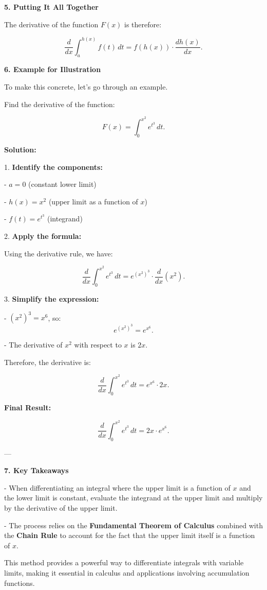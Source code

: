 \documentclass[a4paper,12pt]{book}
\begin{document}
\textbf{5. Putting It All Together}

The derivative of the function \( F(x) \) is therefore:

\[
\dfrac{d}{dx} \int_{a}^{h(x)} f(t) \, dt = f(h(x)) \cdot \dfrac{dh(x)}{dx}.
\]

\textbf{6. Example for Illustration}

To make this concrete, let's go through an example.

Find the derivative of the function:

\[
F(x) = \int_{0}^{x^2} e^{t^3} \, dt.
\]

\textbf{Solution:}

1. \textbf{Identify the components:}

- \( a = 0 \) (constant lower limit)

- \( h(x) = x^2 \) (upper limit as a function of \( x \))

- \( f(t) = e^{t^3} \) (integrand)

2. \textbf{Apply the formula:}

   Using the derivative rule, we have:

   \[
   \dfrac{d}{dx} \int_{0}^{x^2} e^{t^3} \, dt = e^{(x^2)^3} \cdot \dfrac{d}{dx}(x^2).
   \]

3. \textbf{Simplify the expression:}

- \( (x^2)^3 = x^6 \), so:
     \[
     e^{(x^2)^3} = e^{x^6}.
     \]

- The derivative of \( x^2 \) with respect to \( x \) is \( 2x \).

   Therefore, the derivative is:

   \[
   \dfrac{d}{dx} \int_{0}^{x^2} e^{t^3} \, dt = e^{x^6} \cdot 2x.
   \]

\textbf{Final Result:}

\[
\dfrac{d}{dx} \int_{0}^{x^2} e^{t^3} \, dt = 2x \cdot e^{x^6}.
\]

---

\textbf{7. Key Takeaways}

- When differentiating an integral where the upper limit is a function of \( x \) and the lower limit is constant, evaluate the integrand at the upper limit and multiply by the derivative of the upper limit.

- The process relies on the \textbf{Fundamental Theorem of Calculus} combined with the \textbf{Chain Rule} to account for the fact that the upper limit itself is a function of \( x \).

This method provides a powerful way to differentiate integrals with variable limits, making it essential in calculus and applications involving accumulation functions.
\end{document}
